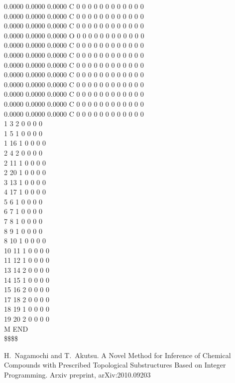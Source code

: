 \documentclass[11pt,titlepage,dvipdfmx,twoside]{jarticle}
\begin{document}
\begin{oframed}
{    0.0000    0.0000    0.0000  C  0  0  0  0  0  0  0  0  0  0  0  0 \\
    0.0000    0.0000    0.0000  C  0  0  0  0  0  0  0  0  0  0  0  0 \\
    0.0000    0.0000    0.0000  C  0  0  0  0  0  0  0  0  0  0  0  0 \\
    0.0000    0.0000    0.0000  O  0  0  0  0  0  0  0  0  0  0  0  0 \\
    0.0000    0.0000    0.0000  C  0  0  0  0  0  0  0  0  0  0  0  0 \\
    0.0000    0.0000    0.0000  C  0  0  0  0  0  0  0  0  0  0  0  0 \\
    0.0000    0.0000    0.0000  C  0  0  0  0  0  0  0  0  0  0  0  0 \\
    0.0000    0.0000    0.0000  C  0  0  0  0  0  0  0  0  0  0  0  0 \\
    0.0000    0.0000    0.0000  C  0  0  0  0  0  0  0  0  0  0  0  0 \\
    0.0000    0.0000    0.0000  C  0  0  0  0  0  0  0  0  0  0  0  0 \\
    0.0000    0.0000    0.0000  C  0  0  0  0  0  0  0  0  0  0  0  0 \\
    0.0000    0.0000    0.0000  C  0  0  0  0  0  0  0  0  0  0  0  0 \\
  1  3  2  0  0  0  0 \\
  1  5  1  0  0  0  0 \\
  1 16  1  0  0  0  0 \\
  2  4  2  0  0  0  0 \\
  2 11  1  0  0  0  0 \\
  2 20  1  0  0  0  0 \\
  3 13  1  0  0  0  0 \\
  4 17  1  0  0  0  0 \\
  5  6  1  0  0  0  0 \\
  6  7  1  0  0  0  0 \\
  7  8  1  0  0  0  0 \\
  8  9  1  0  0  0  0 \\
  8 10  1  0  0  0  0 \\
 10 11  1  0  0  0  0 \\
 11 12  1  0  0  0  0 \\
 13 14  2  0  0  0  0 \\
 14 15  1  0  0  0  0 \\
 15 16  2  0  0  0  0 \\
 17 18  2  0  0  0  0 \\
 18 19  1  0  0  0  0 \\
 19 20  2  0  0  0  0 \\
M  END \\
\$\$\$\$}
\end{oframed}

\begin{thebibliography}{10}
		H.~Nagamochi and T.~Akutsu.
		A Novel Method for Inference of Chemical Compounds with Prescribed Topological Substructures Based on Integer Programming.
		Arxiv preprint, arXiv:2010.09203
\end{thebibliography}
\end{document}
